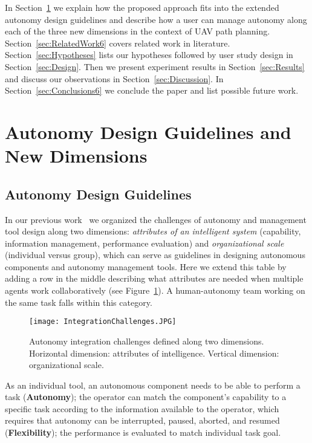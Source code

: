 In Section~\ref{sec:dimensions} we explain how the proposed approach fits into the extended autonomy design guidelines and describe how a user can manage autonomy along each of the three new dimensions in the context of UAV path planning. Section~\ref{sec:RelatedWork6} covers related work in literature. Section~\ref{sec:Hypotheses} lists our hypotheses followed by user study design in Section~\ref{sec:Design}. Then we present experiment results in Section~\ref{sec:Results} and discuss our observations in Section~\ref{sec:Discussion}. In Section~\ref{sec:Conclusions6} we conclude the paper and list possible future work.

\section{Autonomy Design Guidelines and New Dimensions}
\label{sec:dimensions}

\subsection{Autonomy Design Guidelines}

In our previous work~\cite{Lin2010Supporting} we organized the challenges of autonomy and management tool design along two dimensions: \textit{attributes of an intelligent system} (capability, information management, performance evaluation) and \textit{organizational scale} (individual versus group), which can serve as guidelines in designing autonomous components and autonomy management tools. Here we extend this table by adding a row in the middle describing what attributes are needed when multiple agents work collaboratively (see Figure~\ref{IChallenges}). A human-autonomy team working on the same task falls within this category. 

\begin{figure}
\centering
\texttt{[image: IntegrationChallenges.JPG]}
\caption{Autonomy integration challenges defined along two dimensions. Horizontal dimension: attributes of intelligence. Vertical dimension: organizational scale.}
\label{IChallenges}
\end{figure}

As an individual tool, an autonomous component needs to be able to perform a task (\textbf{Autonomy}); the operator can match the component's capability to a specific task according to the information available to the operator, which requires that autonomy can be interrupted, paused, aborted, and resumed (\textbf{Flexibility}); the performance is evaluated to match individual task goal. 

